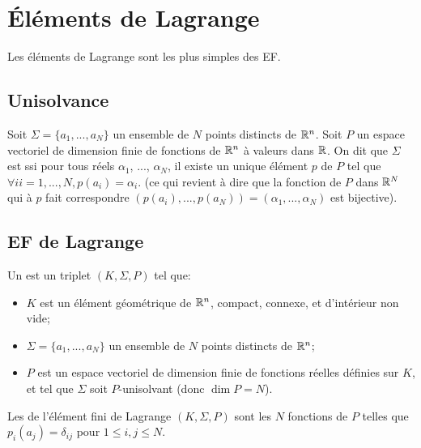 \medskip
\section{Éléments de Lagrange}

Les éléments de Lagrange sont les plus simples des EF.

\medskip
\subsection{Unisolvance}\label{Sec-unisolvance}

\begin{definition}[Unisolvance]
Soit $\Sigma=\{a_1, ..., a_N\}$ un ensemble de $N$ points distincts de $\mathbb R^n$.
Soit $P$ un espace vectoriel de dimension finie de fonctions de $\mathbb R^n$ à valeurs dans $\mathbb R$.
On dit que $\Sigma$ est  ssi pour tous réels $\alpha_1$, ..., $\alpha_N$, 
il existe un unique élément $p$ de $P$ tel que $\forall ii=1,..., N, p(a_i) = \alpha_i$.
(ce qui revient à dire que la fonction de $P$ dans $\mathbb R^N$ qui à $p$ fait correspondre
$(p(a_i),..., p(a_N))=(\alpha_1,..., \alpha_N)$ est bijective).
\end{definition}

\medskip
\subsection{EF de Lagrange}

\begin{definition}[EF de Lagrange]
Un  est un triplet $(K, \Sigma, P)$ tel que:
\begin{itemize}
   \item $K$ est un élément géométrique de $\mathbb R^n$, compact, connexe, et d'intérieur
	non vide;
   \item $\Sigma=\{a_1, ..., a_N\}$ un ensemble de $N$ points distincts de $\mathbb R^n$;
   \item $P$ est un espace vectoriel de dimension finie de fonctions réelles définies sur $K$, et tel
	que $\Sigma$ soit $P$-unisolvant (donc $\dim P = N$).
\end{itemize}
\end{definition}

\medskip
Les  de l'élément fini de Lagrange $(K, \Sigma, P)$
sont les $N$ fonctions de $P$ telles que $p_i(a_j)=\delta_{ij}$ pour $1\le i,j\le N$.

